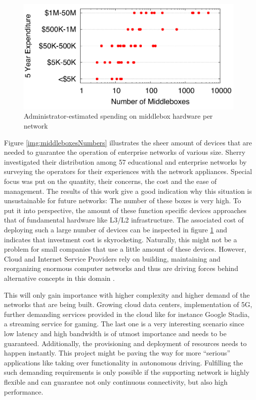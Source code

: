 \begin{figure}[H]
	\centering
	\includegraphics[width=1\linewidth]{images/middleboxesCost.png}
	\caption{Administrator-estimated spending on middlebox hardware per network \cite{sherry2016middleboxes}}
	\label{img:middleboxesCost}
\end{figure}

Figure \ref{img:middleboxesNumbers} illustrates the sheer amount of devices that are needed to guarantee the operation of enterprise networks of various size. Sherry \cite{sherry2012survey} \cite{sherry2016middleboxes} investigated their distribution among 57 educational and enterprise networks by surveying the operators for their experiences with the network appliances. Special focus was put on the quantity, their concerns, the cost and the ease of management. The results of this work give a good indication why this situation is unsustainable for future networks:  The number of these boxes is very high. To put it into perspective, the amount of these function specific devices approaches that of fundamental hardware like L3/L2 infrastructure. The associated cost of deploying such a large number of devices can be inspected in figure \ref{img:middleboxesCost} and indicates that investment cost is skyrocketing. Naturally, this might not be a problem for small companies that use a little amount of these devices. However, Cloud and Internet Service Providers rely on building, maintaining and reorganizing enormous computer networks and thus are driving forces behind alternative concepts in this domain \cite{sherry2016middleboxes} \cite{sherry2012survey}.

This will only gain importance with higher complexity and higher demand of the networks that are being built. Growing cloud data centers, implementation of 5G, further demanding services provided in the cloud like for instance Google Stadia, a streaming service for gaming. The last one is a very interesting scenario since low latency and high bandwidth is of utmost importance and needs to be guaranteed. Additionally, the provisioning and deployment of resources needs to happen instantly. This project might be paving the way for more ``serious'' applications like taking over functionality in autonomous driving. Fulfilling the such demanding requirements is only possible if the supporting network is highly flexible and can guarantee not only continuous connectivity, but also high performance. 

